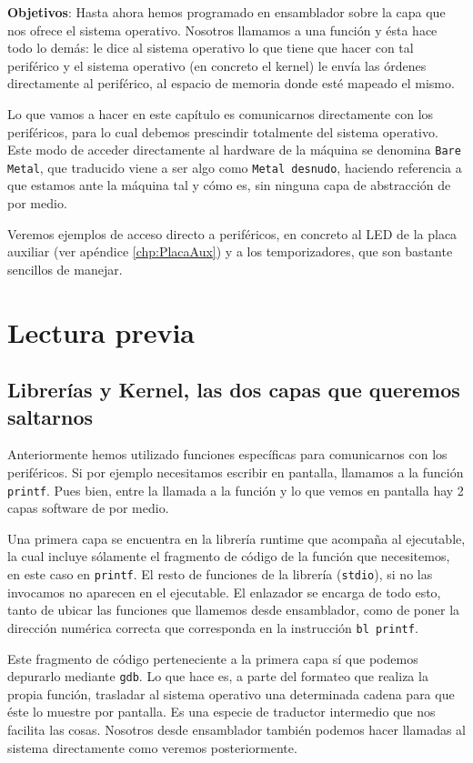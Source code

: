 \label{chp:Subrut}
\minitoc

{\bf Objetivos}: Hasta ahora hemos programado en ensamblador sobre
la capa que nos ofrece el sistema operativo. Nosotros llamamos a una
función y ésta hace todo lo demás: le dice al sistema operativo lo
que tiene que hacer con tal periférico y el sistema operativo (en concreto
el kernel) le envía las órdenes directamente al periférico, al espacio
de memoria donde esté mapeado el mismo.

Lo que vamos a hacer en este capítulo es comunicarnos directamente con los
periféricos, para lo cual debemos prescindir totalmente del sistema operativo.
Este modo de acceder directamente al hardware de la máquina se denomina {\tt Bare Metal},
que traducido viene a ser algo como {\tt Metal desnudo}, haciendo referencia a
que estamos ante la máquina tal y cómo es, sin ninguna capa de abstracción de
por medio.

Veremos ejemplos de acceso directo a periféricos, en concreto al LED de la placa
auxiliar (ver apéndice \ref{chp:PlacaAux}) y a los temporizadores, que son
bastante sencillos de manejar.

\section{Lectura previa}

\subsection{Librerías y Kernel, las dos capas que queremos saltarnos}

Anteriormente hemos utilizado funciones específicas para
comunicarnos con los periféricos. Si por ejemplo necesitamos escribir
en pantalla, llamamos a la función {\tt printf}. Pues bien, entre
la llamada a la función y lo que vemos en pantalla hay 2 capas software
de por medio.

Una primera capa se encuentra en la librería runtime que acompaña al
ejecutable, la cual incluye sólamente el fragmento de código de la
función que necesitemos, en este caso en {\tt printf}. El resto de
funciones de la librería ({\tt stdio}), si no las invocamos no aparecen
en el ejecutable. El enlazador se encarga de todo esto, tanto de ubicar
las funciones que llamemos desde ensamblador, como de poner la dirección
numérica correcta que corresponda en la instrucción {\tt bl printf}.

Este fragmento de código perteneciente a la primera capa sí que podemos
depurarlo mediante {\tt gdb}. Lo que hace es, a parte del formateo que
realiza la propia función, trasladar al sistema operativo una determinada
cadena para que éste lo muestre por pantalla. Es una especie de traductor
intermedio que nos facilita las cosas. Nosotros desde ensamblador también
podemos hacer llamadas al sistema directamente como veremos posteriormente.

